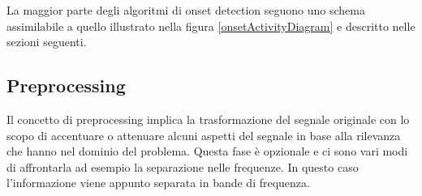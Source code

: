 \fi

































La maggior parte degli algoritmi di onset detection seguono uno schema assimilabile a quello illustrato nella figura \ref{onsetActivityDiagram} e descritto nelle sezioni seguenti.
\subsection{Preprocessing}
    Il concetto di preprocessing implica la trasformazione del segnale originale con lo scopo di accentuare o attenuare alcuni aspetti del segnale in base alla rilevanza che hanno nel dominio del problema. Questa fase \`e opzionale e ci sono vari modi di affrontarla ad esempio la separazione nelle frequenze. In questo caso l'informazione viene appunto separata in bande di frequenza.
	


